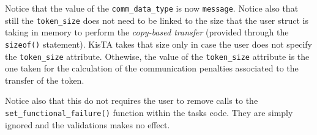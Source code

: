 Notice that the value of the \texttt{comm\_data\_type} is now \texttt{message}. Notice also that still the \texttt{token\_size} does not need to be linked to the size that the user struct is taking in memory to perform the \emph{copy-based transfer} (provided through the \texttt{sizeof()} statement). KisTA takes that size only in case the user does not specify the \texttt{token\_size} attribute. Othewise, the value of the \texttt{token\_size} attribute is the one taken for the calculation of the communication penalties associated to the transfer of the token.

Notice also that this do not requires the user to remove calls to the \texttt{set\_functional\_failure()} function within the tasks code. They are simply ignored and the validations makes no effect.

